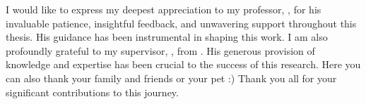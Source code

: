 
I would like to express my deepest appreciation to my professor, \reviewer, for his invaluable patience, insightful feedback, and unwavering support throughout this thesis. His guidance has been instrumental in shaping this work.
I am also profoundly grateful to my supervisor, \supervisor, from \company.
His generous provision of knowledge and expertise has been crucial to the success of this research.
Here you can also thank your family and friends or your pet :)
\newline
Thank you all for your significant contributions to this journey.